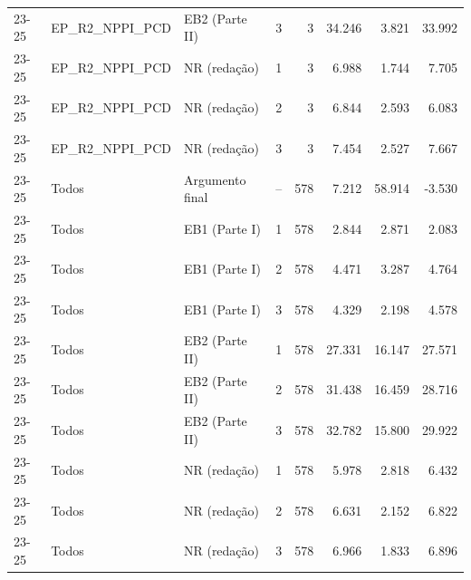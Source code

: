 \begin{longtable}{lllcrrrr}
23-25 & EP\_R2\_NPPI\_PCD & EB2 (Parte II) & 3 & 3 & 34.246 & 3.821 & 33.992 \\
23-25 & EP\_R2\_NPPI\_PCD & NR (redação) & 1 & 3 & 6.988 & 1.744 & 7.705 \\
23-25 & EP\_R2\_NPPI\_PCD & NR (redação) & 2 & 3 & 6.844 & 2.593 & 6.083 \\
23-25 & EP\_R2\_NPPI\_PCD & NR (redação) & 3 & 3 & 7.454 & 2.527 & 7.667 \\
23-25 & Todos & Argumento final & -- & 578 & 7.212 & 58.914 & -3.530 \\
23-25 & Todos & EB1 (Parte I) & 1 & 578 & 2.844 & 2.871 & 2.083 \\
23-25 & Todos & EB1 (Parte I) & 2 & 578 & 4.471 & 3.287 & 4.764 \\
23-25 & Todos & EB1 (Parte I) & 3 & 578 & 4.329 & 2.198 & 4.578 \\
23-25 & Todos & EB2 (Parte II) & 1 & 578 & 27.331 & 16.147 & 27.571 \\
23-25 & Todos & EB2 (Parte II) & 2 & 578 & 31.438 & 16.459 & 28.716 \\
23-25 & Todos & EB2 (Parte II) & 3 & 578 & 32.782 & 15.800 & 29.922 \\
23-25 & Todos & NR (redação) & 1 & 578 & 5.978 & 2.818 & 6.432 \\
23-25 & Todos & NR (redação) & 2 & 578 & 6.631 & 2.152 & 6.822 \\
23-25 & Todos & NR (redação) & 3 & 578 & 6.966 & 1.833 & 6.896 \\
\end{longtable}
